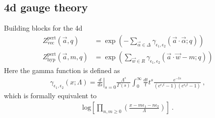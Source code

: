 \documentclass[11pt]{article}
\def\a{\alpha}
\def\e{\epsilon}
\begin{document}
\subsection{4d gauge theory}
Building blocks for the 4d
\begin{align}
 Z_{\textrm{vec}}^{\textrm{pert}}(\vec{a}, q) &= \exp \left( - \sum_{\vec \a \in \Delta} \gamma_{\e_1, \e_2}  (\vec{a} \cdot {\vec{\a}}; q )\right) \\
 Z_{\textrm{hyp}}^{\textrm{pert}} (\vec{a}, m, q)&= \exp \left( \sum_{\vec{w} \in R} \gamma_{\e_1, \e_2} ( \vec{a} \cdot {\vec{w}} - m; q)\right)
\end{align}
Here the gamma function is defined as
\begin{align}
 \gamma_{\e_1, \e_2} (x; \Lambda) = \left. \frac{d}{ds} \right|_{s=0} \frac{\Lambda^s}{\Gamma(s)} \int_0^{\infty} \frac{dt}{t} t^s \frac{e^{-ts}}{(e^{\e_1 t} - 1)(e^{\e_2 t} - 1)} \ , 
\end{align}
which is formally equivalent to 
\begin{align}
 \textrm{log} \left[\prod_{n, m\ge 0} \left( \frac{x - m\e_1 - n \e_2}{\Lambda} \right) \right] \ . 
\end{align}
\end{document}
